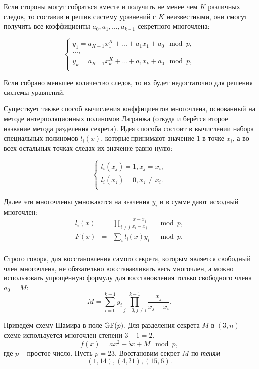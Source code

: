 Если стороны могут собраться вместе и получить не менее чем $K$ различных следов, то составив и решив систему уравнений с $K$ неизвестными, они смогут получить все коэффициенты $a_0, a_1, \dots, a_{k-1}$ секретного многочлена:

\[ \left\{ \begin{array}{l}
    y_1 = a_{K-1}x_1^K + \dots + a_1 x_1 + a_0 \mod p, \\
    \dots, \\
    y_k = a_{K-1}x_k^K + \dots + a_1 x_k + a_0 \mod p, \\
\end{array} \right. \]

Если собрано меньшее количество следов, то их будет недостаточно для решения системы уравнений.

Существует также способ вычисления коэффициентов многочлена, основанный на методе интерполяционных полиномов Лагранжа (откуда и берётся второе название метода разделения секрета). Идея способа состоит в вычислении набора специальных полиномов $l_i \left( x \right)$, которые принимают значение $1$ в точке $x_i$, а во всех остальных точках-следах их значение равно нулю:

\[ \begin{cases}
	l_i \left( x_j \right) = 1, x_j = x_i, \\
	l_i \left( x_j \right) = 0, x_j \ne x_i. \\
\end{cases} \]

Далее эти многочлены умножаются на значения $y_i$ и в сумме дают исходный многочлен:
\[\begin{array}{llll}
  l_i \left( x \right) &=& \prod\limits_{i \ne j} {\frac{{x - x_j }}{{x_i  - x_j }}} &\mod p, \\
  F\left( x \right) &=& \sum\limits_i {l_i \left( x \right)y_i } &\mod p. \\
\end{array}\]

Строго говоря, для восстановления самого секрета, которым является свободный член многочлена, не обязательно восстанавливать весь многочлен, а можно использовать упрощённую формулу для восстановления только свободного члена $a_0 = M$:
    \[ M = \sum\limits_{i=0}^{k-1} y_i \prod\limits_{j=0, j \neq i}^{k-1} \frac{x_j}{x_j - x_i}. \]

\example
Приведём схему Шамира в поле $\mathbb{GF}(p)$. Для разделения секрета $M$ в $(3,n)$ схеме используется многочлен степени $3-1=2$.
    \[ f(x) = a x^2 + b x + M \mod p, \]
где $p$ -- простое число. Пусть $p=23$. Восстановим секрет $M$ по \emph{теням}
    \[ (1,14), (4,21), (15,6). \]

